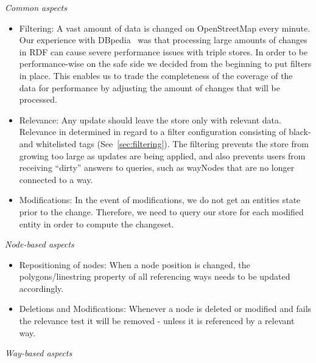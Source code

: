 \emph{Common aspects}
\begin{itemize}
  \item Filtering: A vast amount of data is changed on OpenStreetMap every
  minute. Our experience with DBpedia~\cite{stadler-c-2010--a} was
  that processing large amounts of changes in RDF can cause severe performance
  issues with triple stores. In order to be performance-wise on the safe
  side we decided from the beginning to put filters in place. This enables us to
  trade the completeness of the coverage of the data for performance by
  adjusting the amount of changes that will be processed.
  \item Relevance: Any update
  should leave the store only with relevant data. Relevance
  in determined in regard to a filter configuration consisting of
  black- and whitelisted tags (See~\ref{sec:filtering}).
  The filtering prevents the store from growing too large as updates are being
  applied, and also prevents users from receiving ``dirty'' answers to queries, such as wayNodes that are no longer connected to a
  way.
  \item Modifications: In the event of modifications, we do not get an entities
  state prior to the change. Therefore, we need to query our store for each
  modified entity in order to compute the changeset.
\end{itemize}
\emph{Node-based aspects}
\begin{itemize}
  \item Repositioning of nodes: When a node position is changed, the
  polygons/linestring property of all referencing ways needs to be updated
  accordingly.
  \item Deletions and Modifications: Whenever a node is deleted or modified and
  fails the relevance test it will be removed - unless it is referenced by
  a relevant way.
\end{itemize}
\emph{Way-based aspects}
